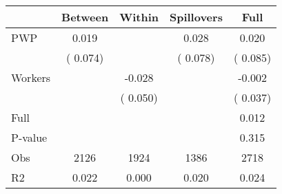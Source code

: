 
\begin{tabular}{l*{4}{c}}\hline&\multicolumn{1}{c}{Between}&\multicolumn{1}{c}{Within}&\multicolumn{1}{c}{Spillovers}&\multicolumn{1}{c}{Full}\\ \hline
 PWP           &              0.019      &                                               &        0.028 &         0.020                            \\ 
                               &        (       0.074)           &                                       &       (       0.078)     &      (       0.085)                                           \\ 
 Workers       &                                               &       -0.028    &                                &            -0.002                            \\ 
                               &                                               & (       0.050)                  &                                        &      (       0.037)                                           \\ 
\hline                                                                                                                                                                                                                                            
 Full                  &                                               &                                               &                                        &             0.012                                     \\ 
 P-value               &                                               &                                               &                                        &             0.315                                           \\ 
 Obs                   &               2126               &       1924                       &       1386                &              2718                                               \\ 
 R2                    &                      0.022              &              0.000                      &              0.020               &                     0.024                                              \\ 
\hline \end{tabular}                                                                                                                                                                                                              